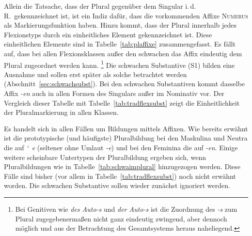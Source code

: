 Allein die Tatsache, dass der Plural gegenüber dem Singular i.\,d.\,R.\ gekennzeichnet ist, ist ein Indiz dafür, dass die vorkommenden Affixe \textsc{Numerus} als Markierungsfunktion haben.
Hinzu kommt, dass der Plural innerhalb jedes Flexionstyps durch ein einheitliches Element gekennzeichnet ist.
Diese einheitlichen Elemente sind in Tabelle~\ref{tab:plaffixe} zusammengefasst.
Es fällt auf, dass bei allen Flexionsklassen außer den schwachen das Affix eindeutig dem Plural zugeordnet werden kann.%
\footnote{Bei Genitiven wie \textit{des Auto-s} und \textit{der Auto-s} ist die Zuordnung des \textit{-s} zum Plural zugegebenermaßen nicht ganz eindeutig zwingend, aber dennoch möglich und aus der Betrachtung des Gesamtsystems heraus naheliegend.}
Die schwachen Substantive (S1) bilden eine Ausnahme und sollen erst später als solche betrachtet werden (Abschnitt~\ref{sec:schwachsubst}).
Bei den schwachen Substantiven kommt dasselbe Affix \textit{-en} auch in allen Formen des Singulars außer im Nominativ vor.
Der Vergleich dieser Tabelle mit Tabelle~\ref{tab:tradflexsubst} zeigt die Einheitlichkeit der Pluralmarkierung in allen Klassen.

\begin{table}[!htbp]
  \centering
  \caption{Übersicht über die Plural-Affixe mit Beispielen}
  \label{tab:plaffixe}
\end{table}

Es handelt sich in allen Fällen um Bildungen mittels Affixen.
Wie bereits erwähnt ist die prototypische (und häufigste) Pluralbildung bei den Maskulina und Neutra die auf \textit{\char`~e} (seltener ohne Umlaut \textit{-e}) und bei den Feminina die auf \textit{-en}.
Einige weitere scheinbare Untertypen der Pluralbildung ergeben sich, wenn Pluralbildungen wie in Tabelle~\ref{tab:schwaimplural} hinzugezogen werden.
Diese Fälle sind bisher (vor allem in Tabelle~\ref{tab:tradflexsubst}) noch nicht erwähnt worden.
Die schwachen Substantive sollen wieder zunächst ignoriert werden.

